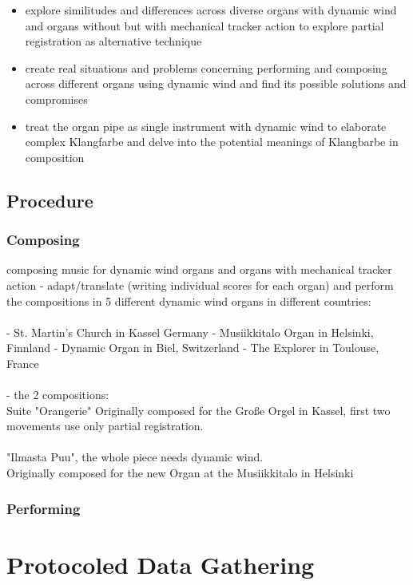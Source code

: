 \begin{itemize}
\item explore similitudes and differences across diverse organs with dynamic wind and organs without but with mechanical tracker action to explore partial registration as alternative technique
\item create real situations and problems concerning performing and composing across different organs using dynamic wind and find its possible solutions and compromises
\item treat the organ pipe as single instrument with dynamic wind to elaborate complex Klangfarbe and delve into the potential meanings of Klangbarbe in composition
\end{itemize}

\subsection{Procedure}

\subsubsection{Composing} 
composing music for dynamic wind organs and organs with mechanical tracker action 
- adapt/translate (writing individual scores for each organ) and perform the compositions in 5 different dynamic wind organs in different countries: \\
\\
- St. Martin's Church in Kassel Germany
- Musiikkitalo Organ in Helsinki, Finnland
- Dynamic Organ in Biel, Switzerland
- The Explorer in Toulouse, France\\
\\
- the 2 compositions: 
\\
Suite "Orangerie" 
Originally composed for the Große Orgel in Kassel, first two movements use only partial registration.\\
\\
"Ilmasta Puu", the whole piece needs dynamic wind.\\
Originally composed for the new Organ at the Musiikkitalo in Helsinki\\

\subsubsection{Performing} 

\section{Protocoled Data Gathering}

